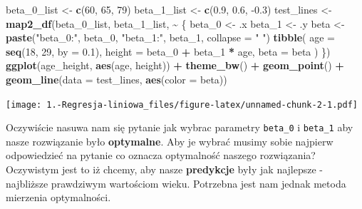\documentclass[
]{article}
\newenvironment{Shaded}{\begin{snugshade}}{\end{snugshade}}
\newcommand{\DataTypeTok}[1]{\textcolor[rgb]{0.13,0.29,0.53}{#1}}
\newcommand{\DecValTok}[1]{\textcolor[rgb]{0.00,0.00,0.81}{#1}}
\newcommand{\FloatTok}[1]{\textcolor[rgb]{0.00,0.00,0.81}{#1}}
\newcommand{\KeywordTok}[1]{\textcolor[rgb]{0.13,0.29,0.53}{\textbf{#1}}}
\newcommand{\NormalTok}[1]{#1}
\newcommand{\OperatorTok}[1]{\textcolor[rgb]{0.81,0.36,0.00}{\textbf{#1}}}
\newcommand{\StringTok}[1]{\textcolor[rgb]{0.31,0.60,0.02}{#1}}
\begin{document}
\begin{Shaded}
\begin{Highlighting}[]
\NormalTok{beta\_}\DecValTok{0}\NormalTok{\_list \textless{}{-}}\StringTok{ }\KeywordTok{c}\NormalTok{(}\DecValTok{60}\NormalTok{, }\DecValTok{65}\NormalTok{, }\DecValTok{79}\NormalTok{)}
\NormalTok{beta\_}\DecValTok{1}\NormalTok{\_list \textless{}{-}}\StringTok{ }\KeywordTok{c}\NormalTok{(}\FloatTok{0.9}\NormalTok{, }\FloatTok{0.6}\NormalTok{, }\FloatTok{{-}0.3}\NormalTok{)}
\NormalTok{test\_lines \textless{}{-}}\StringTok{ }\KeywordTok{map2\_df}\NormalTok{(beta\_}\DecValTok{0}\NormalTok{\_list, beta\_}\DecValTok{1}\NormalTok{\_list, }\OperatorTok{\textasciitilde{}}\StringTok{ }\NormalTok{\{}
\NormalTok{  beta\_}\DecValTok{0}\NormalTok{ \textless{}{-}}\StringTok{ }\NormalTok{.x}
\NormalTok{  beta\_}\DecValTok{1}\NormalTok{ \textless{}{-}}\StringTok{ }\NormalTok{.y}
\NormalTok{  beta \textless{}{-}}\StringTok{ }\KeywordTok{paste}\NormalTok{(}\StringTok{"beta\_0:"}\NormalTok{, beta\_}\DecValTok{0}\NormalTok{, }\StringTok{"beta\_1:"}\NormalTok{, beta\_}\DecValTok{1}\NormalTok{, }\DataTypeTok{collapse =} \StringTok{" "}\NormalTok{)}
  \KeywordTok{tibble}\NormalTok{(}
    \DataTypeTok{age =} \KeywordTok{seq}\NormalTok{(}\DecValTok{18}\NormalTok{, }\DecValTok{29}\NormalTok{, }\DataTypeTok{by =} \FloatTok{0.1}\NormalTok{),}
    \DataTypeTok{height =}\NormalTok{ beta\_}\DecValTok{0} \OperatorTok{+}\StringTok{ }\NormalTok{beta\_}\DecValTok{1} \OperatorTok{*}\StringTok{ }\NormalTok{age,}
    \DataTypeTok{beta =}\NormalTok{ beta}
\NormalTok{  )}
\NormalTok{\})}
\KeywordTok{ggplot}\NormalTok{(age\_height, }\KeywordTok{aes}\NormalTok{(age, height)) }\OperatorTok{+}\StringTok{ }\KeywordTok{theme\_bw}\NormalTok{() }\OperatorTok{+}\StringTok{ }\KeywordTok{geom\_point}\NormalTok{() }\OperatorTok{+}
\StringTok{  }\KeywordTok{geom\_line}\NormalTok{(}\DataTypeTok{data =}\NormalTok{ test\_lines, }\KeywordTok{aes}\NormalTok{(}\DataTypeTok{color =}\NormalTok{ beta))}
\end{Highlighting}
\end{Shaded}

\texttt{[image: 1.-Regresja-liniowa\_files/figure-latex/unnamed-chunk-2-1.pdf]}

Oczywiście nasuwa nam się pytanie jak wybrac parametry \texttt{beta\_0}
i \texttt{beta\_1} aby nasze rozwiązanie było \textbf{optymalne}. Aby je
wybrać musimy sobie najpierw odpowiedzieć na pytanie co oznacza
optymalność naszego rozwiązania? Oczywistym jest to iż chcemy, aby nasze
\textbf{predykcje} były jak najlepsze - najbliższe prawdziwym wartościom
wieku. Potrzebna jest nam jednak metoda mierzenia optymalności.
\end{document}

